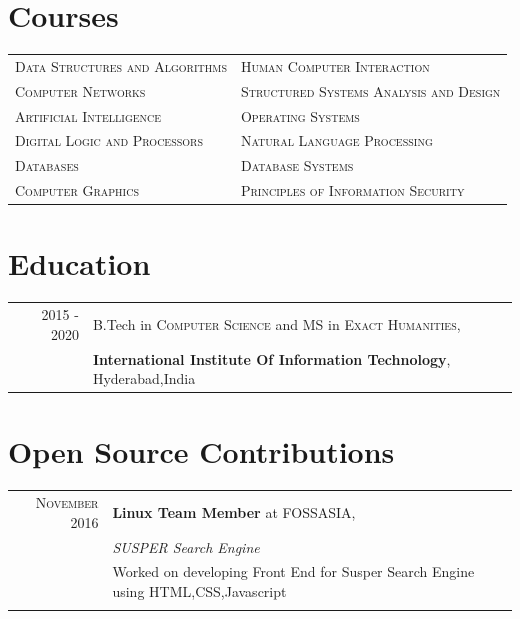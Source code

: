 \documentclass[a4paper,10pt]{article}
\begin{document}
\section{Courses}
\begin{tabular}{ll}	
\textsc{Data Structures and Algorithms} &\textsc{Human Computer Interaction} \\
\textsc{Computer Networks}  &\textsc{Structured Systems Analysis and Design}\\
\textsc{Artificial Intelligence} &\textsc{Operating Systems}\\
\textsc{Digital Logic and Processors} &\textsc{Natural Language Processing}\\
\textsc{Databases} &\textsc{Database Systems}\\
\textsc{Computer Graphics} &\textsc{Principles of Information Security} \\


\end{tabular}

\section{Education}
\begin{tabular}{rl}	
 \textsc{2015 - 2020} & B.Tech in  \textsc{Computer Science} and MS in \textsc{Exact Humanities},\\ 
 & \textbf{International Institute Of Information Technology}, Hyderabad,India\\
\end{tabular}


\section{Open Source Contributions}
\begin{tabular}{rl}	
 \textsc{November} 2016 & \textbf{Linux Team Member} at \textsc{FOSSASIA}, \\
&  \small\emph{SUSPER Search Engine}\\
&  \footnotesize{Worked on developing Front End for Susper Search Engine using HTML,CSS,Javascript}\\\\


\end{tabular}


\end{document}

